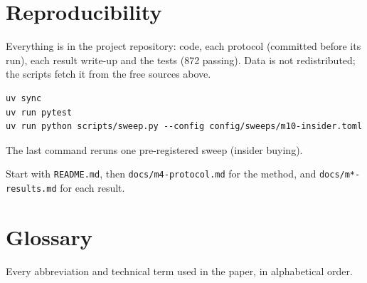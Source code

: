 \documentclass[11pt,a4paper]{article}
\begin{document}
\section{Reproducibility}\label{sec:repro}

Everything is in the project repository: code, each protocol (committed before its run), each result write-up and the tests
(872 passing). Data is not redistributed; the scripts fetch it from the free sources above.

\begin{verbatim}
uv sync
uv run pytest
uv run python scripts/sweep.py --config config/sweeps/m10-insider.toml
\end{verbatim}

The last command reruns one pre-registered sweep (insider buying).

{\sloppy Start with \texttt{README.md}, then \texttt{docs/m4-protocol.md} for the method, and \texttt{docs/m*-results.md} for each result.\par}

\appendix
\clearpage
\section{Glossary}\label{app:glossary}

Every abbreviation and technical term used in the paper, in alphabetical order.
\end{document}
